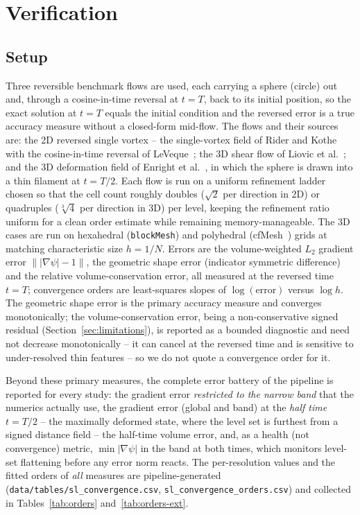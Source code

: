 \documentclass[preprint,3p,11pt]{elsarticle}
\newcommand{\psilev}{\psi}                       %
\newcommand{\gradpsi}{\lvert\nabla\psilev\rvert}
\newcommand{\Lp}[1]{L_{#1}}
\begin{document}
\section{Verification}
\label{sec:verification}

\subsection{Setup}
Three reversible benchmark flows are used, each carrying a sphere (circle) out and,
through a cosine-in-time reversal at $t=T$, back to its initial position, so the exact
solution at $t=T$ equals the initial condition and the reversed error is a true accuracy
measure without a closed-form mid-flow. The flows and their sources are: the 2D reversed
single vortex -- the single-vortex field of Rider and Kothe~\cite{rider1998} with the
cosine-in-time reversal of LeVeque~\cite{leveque1996}; the 3D shear flow of Liovic et
al.~\cite{liovic2006}; and the 3D deformation field of Enright et
al.~\cite{enright2002}, in which the sphere is drawn into a thin filament at $t=T/2$.
Each flow is run on a uniform refinement ladder chosen so that the cell count roughly
doubles ($\sqrt2$ per direction in 2D) or quadruples ($\sqrt[3]{4}$ per direction in 3D)
per level, keeping the refinement ratio uniform for a clean order estimate while
remaining memory-manageable. The 3D cases are run on hexahedral (\texttt{blockMesh}) and
polyhedral (cfMesh~\cite{juretic_cfmesh}) grids at matching characteristic size $h=1/N$.
Errors are the volume-weighted $\Lp{2}$ gradient error $\bigl\|\gradpsi-1\bigr\|$, the
geometric shape error (indicator symmetric difference) and the relative
volume-conservation error, all measured at the reversed time $t=T$; convergence orders
are least-squares slopes of $\log(\text{error})$ versus $\log h$. The geometric shape
error is the primary accuracy measure and converges monotonically; the
volume-conservation error, being a non-conservative signed residual
(Section~\ref{sec:limitations}), is reported as a bounded diagnostic and need not
decrease monotonically -- it can cancel at the reversed time and is sensitive to
under-resolved thin features -- so we do not quote a convergence order for it.

Beyond these primary measures, the complete error battery of the pipeline is reported
for every study: the gradient error \emph{restricted to the narrow band} that the
numerics actually use, the gradient error (global and band) at the \emph{half time}
$t=T/2$ -- the maximally deformed state, where the level set is furthest from a signed
distance field -- the half-time volume error, and, as a health (not convergence)
metric, $\min\lvert\nabla\psilev\rvert$ in the band at both times, which monitors
level-set flattening before any error norm reacts. The per-resolution values and the
fitted orders of \emph{all} measures are pipeline-generated
(\texttt{data/tables/sl\_convergence.csv},
\texttt{sl\_convergence\_orders.csv}) and collected in
Tables~\ref{tab:orders} and~\ref{tab:orders-ext}.
\end{document}
